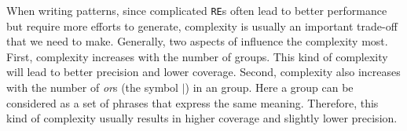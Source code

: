 
When writing \RE patterns, since complicated \texttt{RE}s often lead to better performance but require more efforts to generate, \RE complexity is usually an important trade-off that we need to make. Generally, two aspects of \RE influence the complexity most. First, \RE complexity increases with the number of \RE groups. This kind of complexity will lead to better precision and lower coverage. Second, \RE complexity also increases with the number of \emph{or}s (the symbol $|$) in an \RE group. Here a group can be considered as a set of phrases that express the same meaning. Therefore, this kind of complexity usually results in higher coverage and slightly lower precision.

